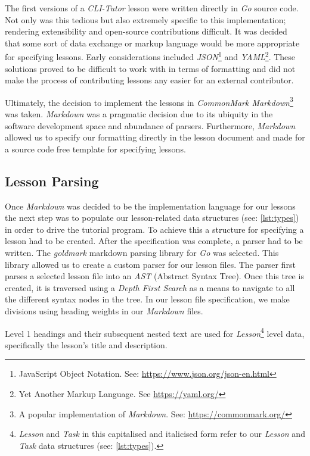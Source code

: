 The first versions of a \textit{CLI-Tutor} lesson were written directly in
\textit{Go} source code. Not only was this tedious but also extremely specific
to this implementation; rendering extensibility and open-source contributions
difficult. It was decided that some sort of data exchange or markup language
would be more appropriate for specifying lessons. Early considerations included
\textit{JSON}\footnote{JavaScript Object Notation. See:
\url{https://www.json.org/json-en.html}} and \textit{YAML}\footnote{Yet Another
Markup Language. See \url{https://yaml.org/}}. These solutions proved to be
difficult to work with in terms of formatting and did not make the process of
contributing lessons any easier for an external contributor.

Ultimately, the decision to implement the lessons in \textit{CommonMark
Markdown}\footnote{A popular implementation of \textit{Markdown}. See:
\url{https://commonmark.org/}} was taken. \textit{Markdown} was a pragmatic
decision due to its ubiquity in the software development space and abundance of
parsers. Furthermore, \textit{Markdown} allowed us to specify our formatting
directly in the lesson document and made for a source code free template for
specifying lessons.

\subsection{Lesson Parsing}
\label{sec:parser}

Once \textit{Markdown} was decided to be the implementation language for our
lessons the next step was to populate our lesson-related data structures (see:
\autoref{lst:types}) in order to drive the tutorial program. To achieve this a
structure for specifying a lesson had to be created. After the specification
was complete, a parser had to be written. The \textit{goldmark} markdown parsing
library for \textit{Go} was selected. This library allowed us to create a
custom parser for our lesson files. The parser first parses a selected lesson
file into an \textit{AST} (Abstract Syntax Tree). Once this tree is created, it
is traversed using a \textit{Depth First Search} as a means to navigate to all
the different syntax nodes in the tree. In our lesson file specification, we
make divisions using heading weights in our \textit{Markdown} files. 

Level 1 headings and their subsequent nested text are used for
\textit{Lesson}\footnote{\textit{Lesson} and \textit{Task} in this
capitalised and italicised form refer to our \textit{Lesson} and \textit{Task}
data structures (see: \autoref{lst:types}).} level data, specifically the
lesson's title and description. 


